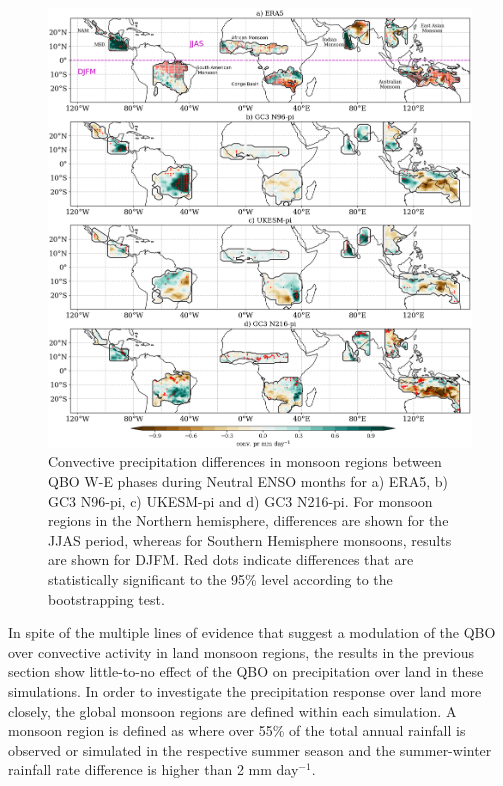 \begin{figure}[t!]
\centering
 \includegraphics[width=\linewidth]{figures/monsoon_cmip_qbownn.png}
\caption[Global monsoon impacts of the QBO.]{ Convective precipitation differences in monsoon regions between QBO W-E  phases during Neutral ENSO months for a) ERA5, b) GC3 N96-pi, c) UKESM-pi and d) GC3 N216-pi. For monsoon regions in the Northern hemisphere, differences are shown for the JJAS period, whereas for Southern Hemisphere monsoons, results are shown for DJFM.  Red dots indicate differences that are statistically significant to the 95\% level according to the bootstrapping test.}
\label{fig:mons_map}
\end{figure}

In spite of the multiple lines of evidence that suggest a modulation of the QBO over convective activity in land monsoon regions, the results in the previous section show little-to-no effect of the QBO on precipitation over land in these simulations. 
In order to investigate the precipitation response over land more closely, the global monsoon regions are defined within each simulation.  A monsoon region is defined as where over 55\% of the total annual rainfall is observed or simulated in the respective summer season and the summer-winter rainfall rate difference is higher than  2 mm day$^{-1}$\citep{wang2008,wang2017,wang2021monsoons}. 

